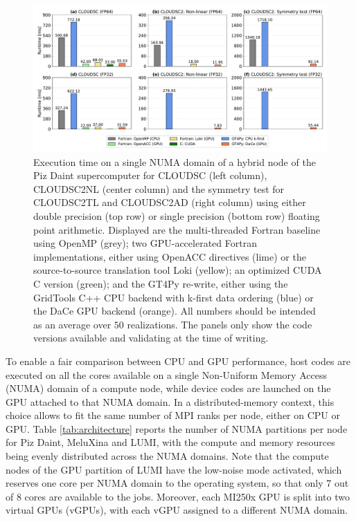 \documentclass[main.tex]{subfiles}
\begin{document}
    \begin{figure}[t!]
        \centering
        \includegraphics[scale=0.44]{img/performance_daint_2.pdf}
        \caption{Execution time on a single NUMA domain of a hybrid node of the Piz Daint supercomputer for CLOUDSC (left column), CLOUDSC2NL (center column) and the symmetry test for CLOUDSC2TL and CLOUDSC2AD (right column) using either double precision (top row) or single precision (bottom row) floating point arithmetic. Displayed are the multi-threaded Fortran baseline using OpenMP (grey); two GPU-accelerated Fortran implementations, either using OpenACC directives (lime) or the source-to-source translation tool Loki (yellow); an optimized CUDA C version (green); and the GT4Py re-write, either using the GridTools C++ CPU backend with k-first data ordering (blue) or the DaCe GPU backend (orange). All numbers should be intended as an average over $50$ realizations. The panels only show the code versions available and validating at the time of writing.}
        \label{fig:performance-daint}
    \end{figure}


    \noindent To enable a fair comparison between CPU and GPU performance, host codes are executed on all the cores available on a single Non-Uniform Memory Access (NUMA) domain of a compute node, while device codes are launched on the GPU attached to that NUMA domain. In a distributed-memory context, this choice allows to fit the same number of MPI ranks per node, either on CPU or GPU. Table \ref{tab:architecture} reports the number of NUMA partitions per node for Piz Daint, MeluXina and LUMI, with the compute and memory resources being evenly distributed across the NUMA domains. Note that the compute nodes of the GPU partition of LUMI have the low-noise mode activated, which reserves one core per NUMA domain to the operating system, so that only 7 out of 8 cores are available to the jobs. Moreover, each MI250x GPU is split into two virtual GPUs (vGPUs), with each vGPU assigned to a different NUMA domain.
\end{document}
